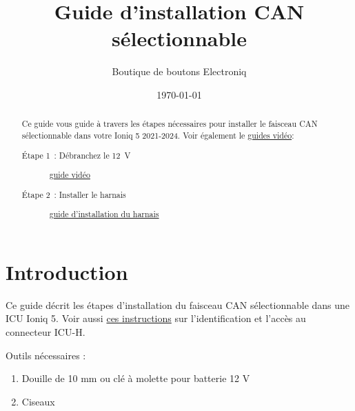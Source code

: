 \documentclass[superscriptaddress,onecolumn,floatfix]{revtex4-2}
\makeatletter
\DeclareRobustCommand{\selectlanguage}[1]{%
    \@ifundefined{alias@\string#1}
      {\ORIGselectlanguage{#1}}
      {\begingroup\edef\x{\endgroup
         \noexpand\ORIGselectlanguage{\@nameuse{alias@#1}}}\x}%
}
\makeatother
\begin{document}
\selectlanguage{fr}

\begin{abstract}
  Ce guide vous guide à travers les étapes nécessaires pour installer le faisceau CAN sélectionnable dans votre Ioniq 5 2021-2024. Voir également le \href{https://youtube.com/playlist?list=PLYCTmVJH4UYqnw87UZAaqMo1GrOv0cJaL}{guides vidéo}:
  \begin{description}
    \item[Étape 1 : Débranchez le 12 V] \href{https://youtu.be/ePBdyeBYKk4}{guide vidéo}
    \item[Étape 2 : Installer le harnais] \href{https://youtu.be/kVvkR4ZLFMI}{guide d'installation du harnais}
  \end{description}
\end{abstract}
\title{Guide d'installation CAN sélectionnable}
\author{Boutique de boutons Electroniq}
\date{\today}

\maketitle


\section{Introduction}
Ce guide décrit les étapes d'installation du faisceau CAN sélectionnable dans une ICU Ioniq 5. Voir aussi \href{https://github.com/dragz/explorationsincarhacking/blob/main/articles/getting_past_the_secure_gateway/getting_past_the_secure_gateway.md}{ces instructions} sur l'identification et l'accès au connecteur ICU-H.

Outils nécessaires :
\begin{enumerate}
  \item Douille de 10 mm ou clé à molette pour batterie 12 V
  \item Ciseaux
\end{enumerate}
\end{document}
